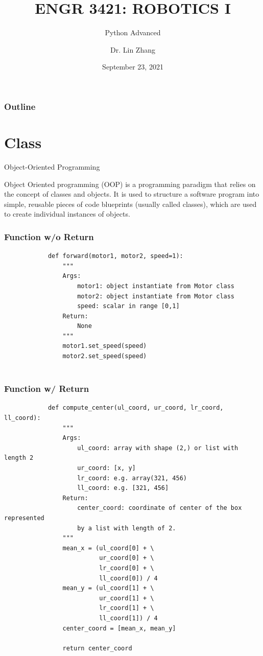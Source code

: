 \documentclass[12pt,letterpaper]{beamer}
\title[Robotics I]
{ENGR 3421: ROBOTICS I}
\subtitle{Python Advanced}
\author[Zhang, Lin]
{Dr. Lin Zhang}
\institute[UCA] %
{
  Department of Physics and Astronomy\\
  University of Central Arkansas
}
\date[Robotics1 2021] %
{September 23, 2021}
\begin{document}
\frame{\titlepage}

\begin{frame}
\frametitle{Outline}
\tableofcontents
\end{frame}

\section{Class}

\begin{frame}{Object-Oriented Programming}

Object Oriented programming (OOP) is a programming paradigm that relies on the concept of classes and objects. 
It is used to structure a software program into simple, reusable pieces of code blueprints (usually called classes), which are used to create individual instances of objects.
\end{frame}

\begin{frame}[fragile]
    \frametitle{Function w/o Return}
        {\scriptsize
        \begin{verbatim}
            def forward(motor1, motor2, speed=1):
                """
                Args:
                    motor1: object instantiate from Motor class
                    motor2: object instantiate from Motor class
                    speed: scalar in range [0,1]
                Return:
                    None
                """
                motor1.set_speed(speed)
                motor2.set_speed(speed)
        
        \end{verbatim}
        }
\end{frame}

\begin{frame}[fragile]
    \frametitle{Function w/ Return}

        {\scriptsize
        \begin{verbatim}
            def compute_center(ul_coord, ur_coord, lr_coord, ll_coord):
                """
                Args:
                    ul_coord: array with shape (2,) or list with length 2
                    ur_coord: [x, y]
                    lr_coord: e.g. array(321, 456)
                    ll_coord: e.g. [321, 456]
                Return:
                    center_coord: coordinate of center of the box represented 
                    by a list with length of 2.
                """
                mean_x = (ul_coord[0] + \
                          ur_coord[0] + \
                          lr_coord[0] + \
                          ll_coord[0]) / 4
                mean_y = (ul_coord[1] + \
                          ur_coord[1] + \
                          lr_coord[1] + \
                          ll_coord[1]) / 4
                center_coord = [mean_x, mean_y]
        
                return center_coord
        \end{verbatim}
        }

\end{frame}
\end{document}
